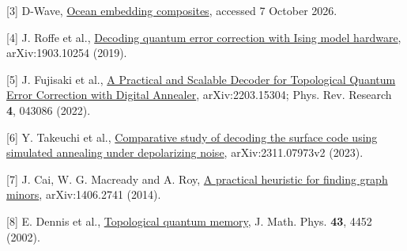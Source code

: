 \documentclass[11pt,letterpaper]{article}
\begin{document}
{\small [3] D-Wave, \href{https://docs.dwavequantum.com/en/latest/ocean/api_ref_system/composites.html}{Ocean embedding composites}, accessed 7 October 2026.\par}\vspace{5pt}

{\small [4] J. Roffe et al., \href{https://arxiv.org/abs/1903.10254}{Decoding quantum error correction with Ising model hardware}, arXiv:1903.10254 (2019).\par}\vspace{5pt}

{\small [5] J. Fujisaki et al., \href{https://arxiv.org/abs/2203.15304}{A Practical and Scalable Decoder for Topological Quantum Error Correction with Digital Annealer}, arXiv:2203.15304; Phys. Rev. Research \textbf{4}, 043086 (2022).\par}\vspace{5pt}

{\small [6] Y. Takeuchi et al., \href{https://arxiv.org/abs/2311.07973}{Comparative study of decoding the surface code using simulated annealing under depolarizing noise}, arXiv:2311.07973v2 (2023).\par}\vspace{5pt}

{\small [7] J. Cai, W. G. Macready and A. Roy, \href{https://arxiv.org/abs/1406.2741}{A practical heuristic for finding graph minors}, arXiv:1406.2741 (2014).\par}\vspace{5pt}

{\small [8] E. Dennis et al., \href{https://arxiv.org/abs/quant-ph/0110143}{Topological quantum memory}, J. Math. Phys. \textbf{43}, 4452 (2002).
\par}\vspace{5pt}
\end{document}
